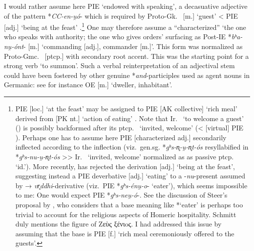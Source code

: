 \documentclass[output=paper,colorlinks,citecolor=brown]{langscibook}
\begin{document}
I would rather assume here PIE  ‘endowed with speaking’, a decasuative adjective of the pattern *\textit{CC-en-u̯ó}- which is required by Proto-Gk.\   [m.] ‘guest’ < PIE  [adj.] ‘being at the feast’ \citep[65]{Garnier2013}.\footnote{PIE  [loc.] ‘at the feast’ may be assigned to PIE  [AK  collective] ‘rich meal’ derived from  [PK nt.] ‘action of eating’ \citep[65]{Garnier2013}. Note that Ir.\  ‘to welcome a guest’ (\citealt[457--458]{Cheung2007}) is possibly backformed after its ptcp.\   ‘invited, welcome’ (< [virtual] PIE ). Perhaps one has to assume here PIE  [characterized adj.] secondarily inflected according to the  inflection (viz.\ gen.sg. *\textit{gʰs-n̥-u̯-n̥t-ós} resyllabified in *\textit{gʰs-nu-u̯-n̥t-ós} {>}{>} Ir.\  ‘invited, welcome’ normalized as as passive ptcp.\   ‘id.’). More recently, \citet[338]{Steer2019} has rejected the derivation  [adj.] ‘being at the feast’, suggesting instead a PIE deverbative  [adj.] ‘eating’ to a -\textit{nu}-present  assumed by \citet[284, 286]{Lipp2009} → \textit{vr̥ddhi}-derivative  (viz.\ PIE *\textit{gʰs-énu̯-o}- ‘eater’), which seems impossible to me: One would expect PIE *\textit{gʰs-neu̯-ó}-. See the discussion of Steer’s proposal by \citet[160--161]{Schmitt2020}, who considers that a base meaning like *‘eater’ is perhaps too trivial to account for the religious aspects of Homeric hospitality. Schmitt duly mentions the figure of Zεὺς  ξένιoς. I had addressed this issue by assuming that the base is PIE  [f.] ‘rich meal ceremoniously offered to the guests’.} One may therefore assume a “characterized”  ‘the one who speaks with authority; the one who gives orders’ surfacing as Post-IE *\textit{bʰa-nu̯-ónt}- [m.] ‘commanding [adj.], commander [m.]’. This form was normalized as Proto-Gmc.\  [ptcp.] with secondary root accent. This was the starting point for a strong verb  ‘to summon’. Such a verbal reinterpretation of an adjectival stem could have been fostered by other genuine *\textit{and}-participles  used as agent nouns in Germanic: see for instance OE  [m.] ‘dweller, inhabitant’.
\end{document}
